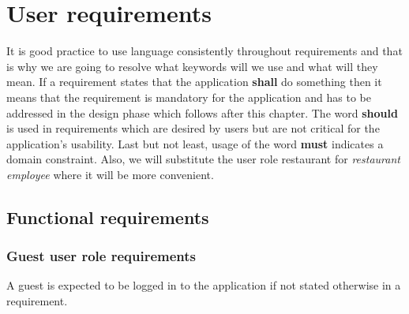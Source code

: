 \section{User requirements}
It is good practice to use language consistently throughout requirements and that is why we are going to resolve what keywords will we use and what will they mean.
If a requirement states that the application \textbf{shall} do something then it means that the requirement is mandatory for the application and has to be addressed in the design phase which follows after this chapter. 
The word \textbf{should} is used in requirements which are desired by users but are not critical for the application's usability.
Last but not least, usage of the word \textbf{must} indicates a domain constraint.
Also, we will substitute the user role restaurant for \emph{restaurant employee} where it will be more convenient.

\subsection{Functional requirements}
\subsubsection{Guest user role requirements}
A guest is expected to be logged in to the application if not stated otherwise in a requirement.

